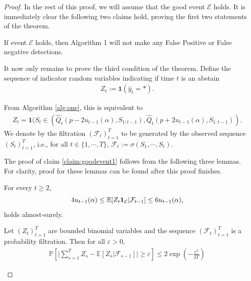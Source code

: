 \begin{proof}
In the rest of this proof, we will assume that the good event $\mathcal{E}$ holds. It is immediately clear the following two claims hold, proving the first two statements of the theorem.
\begin{claim}
If event $\mathcal{E}$ holds, then Algorithm 1 will not make any False Positive or False negative detections.
\label{claim:goodevent1}
\end{claim}

It now only remains to prove the third condition of the theorem. Define the sequence of indicator random variables indicating if time $t$ is an abstain
\begin{align} 
    Z_t := \mathbf{1}(\widehat{y}_t = *) .
\end{align} 

From Algorithm \ref{alg:one}, this is equivalent to 
\begin{align*}
    Z_{t} = \mathbf{1}(S_{t} \in (\widehat{Q}_t(p-2u_{t-1}(\alpha), S_{1:t-1}), \widehat{Q}_t(p+2u_{t-1}(\alpha), S_{1:t-1})).
\end{align*}
We denote by the filtration $(\mathcal{F}_t)_{t=1}^T$ to be generated by the observed sequence $(S_t)_{t=1}^T$, i.e., for all $t \in \{1,\cdots,T\}$, $\mathcal{F}_t := \sigma(S_1,\cdots,S_t)$. 


The proof of claim \ref{claim:goodevent1} follows from the following three lemmas. For clarity, proof for these lemmas can be found after this proof finishes.
 

\begin{lemma}
For every $ t \geq 2$, $$4u_{t-1}(\alpha) \leq \mathbb{E}[Z_t \mathbf{1}_{\mathcal{E}}| \mathcal{F}_{t-1}] \leq 6u_{t-1}(\alpha),$$ holds almost-surely.  
\label{lem:cond_exp}
\end{lemma}

\begin{lemma} 
Let $(Z_t)_{t=1}^T$ are bounded binomial variables and the sequence $(\mathcal{F}_t)_{t=1}^T$ is a probability filtration. Then for all $\varepsilon > 0$,
\begin{align*}
    \mathbb{P} \left[ \bigg| \sum_{s=1}^T Z_s  - \mathbb{E}[Z_s  \vert \mathcal{F}_{s-1}] \bigg| \geq \varepsilon \right] \leq 2 \exp \left( -\frac{ \varepsilon^2}{2T} \right)
\end{align*}
\label{lemma:azuma}
\end{lemma}


\end{proof}
